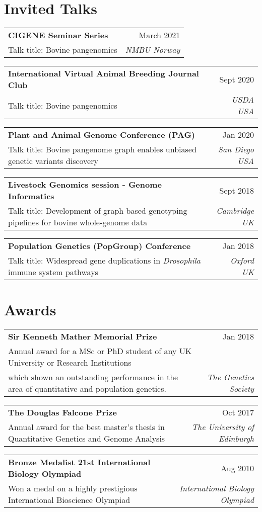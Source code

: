 \documentclass[letterpaper,10pt]{article}
\makeatletter
\newcommand{\resumetalk}[4]{\small{
  \vspace{-2pt}\item
    \begin{tabular*}{0.97\textwidth}[t]{l@{\extracolsep{\fill}}r}
      \textbf{#1} & #2 \\
      \small#3 & \textit{\small #4} \\
    \end{tabular*}\vspace{-4pt}
    }
}
\newcommand{\resumeSubHeadingListStart}{\begin{itemize}[leftmargin=0.15in, label={}]}
\newcommand{\resumeSubHeadingListEnd}{\end{itemize}}
\makeatother
\begin{document}
\section{Invited Talks}
   
 \resumeSubHeadingListStart
 \small{
 
    \resumetalk {CIGENE Seminar Series}{March 2021}
      {Talk title: Bovine pangenomics}{NMBU Norway}
      \resumetalk {International Virtual Animal Breeding Journal Club}{Sept 2020}
      {Talk title: Bovine pangenomics}{USDA USA}
   \resumetalk {Plant and Animal Genome Conference (PAG)}{Jan 2020}
      {Talk title: Bovine pangenome graph enables unbiased genetic variants discovery}{San Diego USA}
      
  \resumetalk {Livestock Genomics session - Genome Informatics}{Sept 2018}
     {Talk title: Development of graph-based genotyping pipelines for bovine whole-genome data}{Cambridge UK}
     
    \resumetalk {Population Genetics (PopGroup) Conference }{Jan 2018}
     {Talk title: Widespread gene duplications in \textit{Drosophila} immune system pathways}{Oxford UK}
     
      
    }
\resumeSubHeadingListEnd
    
\section{Awards}
   
 \resumeSubHeadingListStart
 \small{
 
    \resumetalk {Sir Kenneth Mather Memorial Prize}{Jan 2018}
      {Annual award for a MSc or PhD student of any UK University or Research Institutions \\ which shown an outstanding performance in the area of quantitative and population genetics. }{The Genetics Society}
    \resumetalk {The Douglas Falcone Prize }{Oct 2017}
      {Annual award for the best master’s thesis in Quantitative Genetics and Genome Analysis}{The University of Edinburgh}
   \resumetalk {Bronze Medalist 21st International Biology Olympiad}{Aug 2010}
      {Won a medal on a highly prestigious International Bioscience Olympiad}{International Biology Olympiad}
     
      
    }
\resumeSubHeadingListEnd
\end{document}
